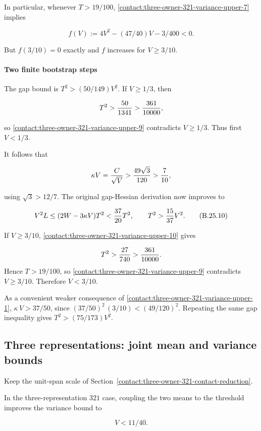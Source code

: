 In particular, whenever $T>19/100$, \eqref{contact:three-owner-321-variance-upper-7} implies

\[
 f(V):=4V^2-(47/40)V-3/400<0.
\tag{B.25.9}\label{contact:three-owner-321-variance-upper-9}
\]

But $f(3/10)=0$ exactly and $f$ increases for $V\ge 3/10$.

\paragraph{Two finite bootstrap steps}

The gap bound is $T^2>(50/149)V^2$. If $V\ge 1/3$,
then

\[
 T^2>{50\over1341}>{361\over10000},
\]

so \eqref{contact:three-owner-321-variance-upper-9} contradicts $V\ge 1/3$. Thus first $V<1/3$.

It follows that

\[
 \kappa V={C\over\sqrt V}>{49\sqrt3\over120}>{7\over10},
\]

using $\sqrt{3}>12/7$. The original gap-Hessian derivation now improves to

\[
 V^2L\le(2W-3\kappa V)T^2
 <{37\over20}T^2,
 \qquad T^2>{15\over37}V^2.
\tag{B.25.10}\label{contact:three-owner-321-variance-upper-10}
\]

If $V\ge 3/10$, \eqref{contact:three-owner-321-variance-upper-10} gives

\[
 T^2>{27\over740}>{361\over10000}.
\]
Hence $T>19/100$, so
\eqref{contact:three-owner-321-variance-upper-9} contradicts
$V\ge3/10$. Therefore $V<3/10$.

As a convenient weaker consequence of \eqref{contact:three-owner-321-variance-upper-1},
$\kappa\,V>37/50$, since $(37/50)^2\,(3/10)<(49/120)^2$.
Repeating the same gap inequality gives $T^2>(75/173)V^2$.
\subsection{Three representations: joint mean and variance bounds}\label{contact:three-owner-321-joint-mean-bound}
Keep the unit-span scale of Section~\ref{contact:three-owner-321-contact-reduction}.



In the three-representation $321$ case, coupling the two means to the threshold improves the variance bound to

\[
 \boxed{V<11/40.}
\tag{B.26.1}\label{contact:three-owner-321-joint-mean-bound-1}
\]

